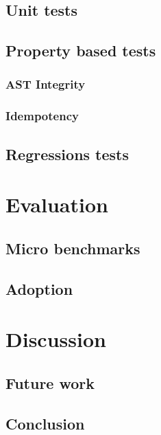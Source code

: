 \documentclass[11pt,a4paper]{article}
\begin{document}
\subsection{Unit tests}
\subsection{Property based tests}
\subsubsection{AST Integrity}
\subsubsection{Idempotency}
\subsection{Regressions tests}
\section{Evaluation}
\subsection{Micro benchmarks}
\subsection{Adoption}\label{sec:adoption}
\section{Discussion}
\subsection{Future work}
\subsection{Conclusion}
\printbibliography{}
\end{document}
